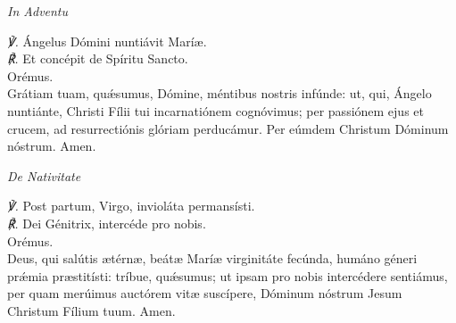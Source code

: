 {\begin{center}
	\textit{In Adventu}
\end{center}
\par\noindent
	\textit{\scshape ℣.} Ángelus Dómini nuntiávit Marí{\ae}.\\
	\textit{\scshape ℟.} Et concépit de Spíritu Sancto.\\
Orémus.\\
Grátiam tuam, quǽsumus, Dómine, méntibus nostris infúnde: ut, qui, Ángelo nuntiánte, Christi Fílii tui incarnatiónem cognóvimus; per passiónem ejus et crucem, ad resurrectiónis glóriam perducámur. Per eúmdem Christum Dóminum nóstrum. Amen.
\begin{center}
	\textit{De Nativitate}
\end{center}
\par\noindent
	\textit{\scshape ℣.} Post partum, Virgo, invioláta permansísti.\\
	\textit{\scshape ℟.} Dei Génitrix, intercéde pro nobis.\\
Orémus.\\
Deus, qui salútis {\ae}térn{\ae}, beát{\ae} Marí{\ae} virginitáte fecúnda, humáno géneri prǽmia pr{\ae}stitísti: tríbue, quǽsumus; ut ipsam pro nobis intercédere sentiámus, per quam merúimus auctórem vit{\ae} suscípere, Dóminum nóstrum Jesum Christum Fílium tuum. Amen.
}
